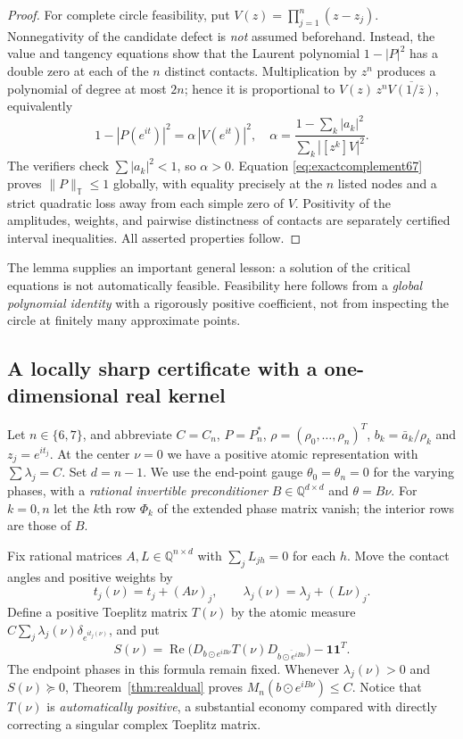 \documentclass[11pt]{article}
\newcommand{\T}{\mathbb T}
\newcommand{\Q}{\mathbb Q}
\DeclareMathOperator{\Rea}{Re}
\begin{document}
\begin{proof}
For complete circle feasibility, put $V(z)=\prod_{j=1}^n(z-z_j)$.  Nonnegativity of the candidate defect is \emph{not} assumed beforehand.  Instead, the value and tangency equations show that the Laurent polynomial $1-|P|^2$ has a double zero at each of the $n$ distinct contacts.  Multiplication by $z^n$ produces a polynomial of degree at most $2n$; hence it is proportional to $V(z)\,z^n\overline{V(1/\bar z)}$, equivalently
\begin{equation}\label{eq:exactcomplement67}
 1-|P(e^{it})|^2=\alpha\,|V(e^{it})|^2,
 \quad \alpha=\frac{1-\sum_k|a_k|^2}{\sum_k|[z^k]V|^2}.
\end{equation}
The verifiers check $\sum|a_k|^2<1$, so $\alpha>0$.  Equation \eqref{eq:exactcomplement67} proves $\|P\|_\T\le1$ globally, with equality precisely at the $n$ listed nodes and a strict quadratic loss away from each simple zero of $V$.  Positivity of the amplitudes, weights, and pairwise distinctness of contacts are separately certified interval inequalities.  All asserted properties follow.
\end{proof}

The lemma supplies an important general lesson: a solution of the critical equations is not automatically feasible.  Feasibility here follows from a \emph{global polynomial identity} with a rigorously positive coefficient, not from inspecting the circle at finitely many approximate points.

\subsection{A locally sharp certificate with a one-dimensional real kernel}\label{sec:atom}

Let $n\in\{6,7\}$, and abbreviate $C=C_n$, $P=P_n^*$, $\rho=(\rho_0,\ldots,\rho_n)^T$, $b_k=\bar a_k/\rho_k$ and $z_j=e^{it_j}$.  At the center $\nu=0$ we have a positive atomic representation with $\sum\lambda_j=C$.  Set $d=n-1$.  We use the end-point gauge $\theta_0=\theta_n=0$ for the varying phases, with a \emph{rational invertible preconditioner} $B\in\Q^{d\times d}$ and $\theta=B\nu$.  For $k=0,n$ let the $k$th row $\Phi_k$ of the extended phase matrix vanish; the interior rows are those of $B$.

Fix rational matrices $A,L\in\Q^{n\times d}$ with $\sum_jL_{jh}=0$ for each $h$.  Move the contact angles and positive weights by
\[
 t_j(\nu)=t_j+(A\nu)_j,\qquad
 \lambda_j(\nu)=\lambda_j+(L\nu)_j.
\]
Define a positive Toeplitz matrix $T(\nu)$ by the atomic measure $C\sum_j\lambda_j(\nu)\delta_{e^{it_j(\nu)}}$, and put
\begin{equation}\label{eq:atomS}
 S(\nu)=\Rea\bigl(D_{b\odot e^{iB\nu}}T(\nu)
 D_{\overline{b\odot e^{iB\nu}}}\bigr)-\mathbf1\mathbf1^T.
\end{equation}
The endpoint phases in this formula remain fixed.  Whenever $\lambda_j(\nu)>0$ and $S(\nu)\succeq0$, Theorem~\ref{thm:realdual} proves $M_n(b\odot e^{iB\nu})\le C$.  Notice that $T(\nu)$ is \emph{automatically positive}, a substantial economy compared with directly correcting a singular complex Toeplitz matrix.
\end{document}
